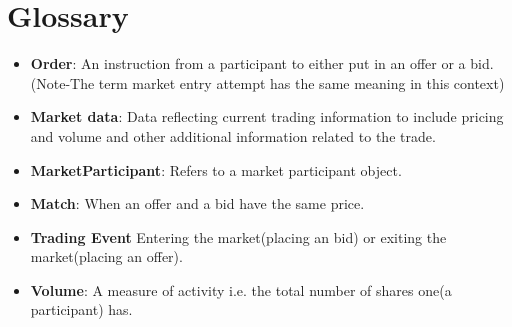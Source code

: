 \documentclass[12pt]{article}
\begin{document}
	\clearpage	
	\newpage				
	\section{Glossary}	
		\begin{itemize}
			\item \textbf{Order}: An instruction from a participant to either put in an offer or a bid.(Note-The term market entry attempt has the same meaning in this context)
			\item \textbf{Market data}: Data reflecting current trading information to include pricing and volume and other additional information related to the trade.
			\item \textbf{MarketParticipant}: Refers to a market participant object. 
			\item \textbf{Match}: When an offer and a bid have the same price.
			\item \textbf{Trading Event} Entering the market(placing an bid) or exiting the market(placing an offer). 
			\item \textbf{Volume}: A measure of activity i.e. the total number of shares one(a participant) has.
		\end{itemize}				    			    			    		
\end{document}
